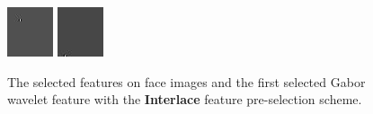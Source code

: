 \begin{figure}[ht]
 \includegraphics[width=\textwidth*11/100]{ch5/figures/firstgabor_C7.jpg}
 \includegraphics[width=\textwidth*11/100]{ch5/figures/firstgabor_C8.jpg}
\caption{The selected features on face images and the first selected Gabor wavelet feature with the \textbf{Interlace} feature pre-selection scheme.}
\label{fig:resultBGC1toC8}
\end{figure} 
